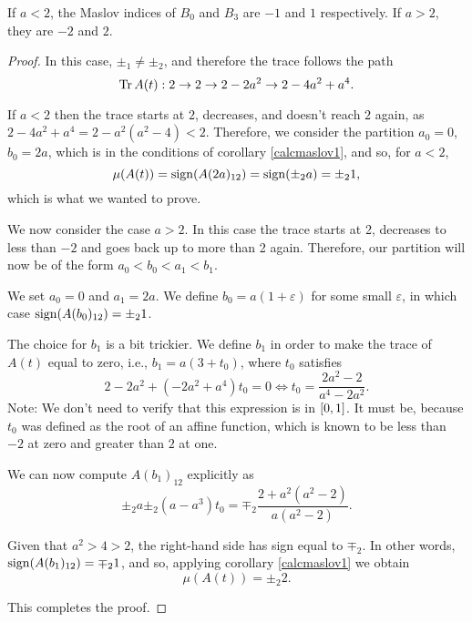 \begin{prop}
If $a < 2$, the Maslov indices of $B_0$ and $B_3$ are $-1$ and $1$ respectively. If $a > 2$, they are $-2$ and $2$.
\end{prop}

\begin{proof}
In this case, $\pm_1 \neq \pm_2$, and therefore the trace follows the path
\begin{equation}
\operatorname{Tr} A(t) : 2 \to 2 \to 2 - 2a^2 \to 2 - 4a^2 + a^4.
\end{equation}

If $a<2$ then the trace starts at $2$, decreases, and doesn't reach $2$ again, as $2 - 4a^2 + a^4 = 2 - a^2 (a^2 - 4) < 2$. Therefore, we consider the partition $a_0 = 0$, $b_0 = 2a$, which is in the conditions of corollary \ref{calcmaslov1}, and so, for $a<2$,
\begin{equation}
\mu(A(t)) = \operatorname{sign}(A(2a)_{12}) = \operatorname{sign}(\pm_2 a) = \pm_2 1,
\end{equation}
which is what we wanted to prove.

\smallskip

We now consider the case $a > 2$. In this case the trace starts at 2, decreases to less than $-2$ and goes back up to more than 2 again. Therefore, our partition will now be of the form $a_0 < b_0 < a_1 < b_1$.

We set $a_0 = 0$ and $a_1 = 2a$. We define $b_0 = a(1+\varepsilon)$ for some small $\varepsilon$, in which case $\operatorname{sign}(A(b_0)_{12}) = \pm_2 1$.

The choice for $b_1$ is a bit trickier. We define $b_1$ in order to make the trace of $A(t)$ equal to zero, i.e., $b_1 = a(3 + t_0)$, where $t_0$ satisfies
\begin{equation}
2 - 2a^2 + (-2a^2 + a^4)t_0 = 0 \iff t_0 = \frac{2a^2 - 2}{a^4 - 2a^2}.
\end{equation}
Note: We don't need to verify that this expression is in $\interval 0 1$. It must be, because $t_0$ was defined as the root of an affine function, which is known to be less than $-2$ at zero and greater than $2$ at one.

We can now compute $A(b_1)_{12}$ explicitly as
\begin{equation}
\pm_2 a \pm_2 (a - a^3) t_0 = \mp_2 \frac{2 + a^2(a^2 - 2)}{a(a^2 - 2)}.
\end{equation}

Given that $a^2 > 4 > 2$, the right-hand side has sign equal to $\mp_2$. In other words, $\operatorname{sign}(A(b_1)_{12}) = \mp_2 1$, and so, applying corollary \ref{calcmaslov1} we obtain
\begin{equation}
\mu(A(t)) = \pm_2 2.
\end{equation}

This completes the proof.
\end{proof}

